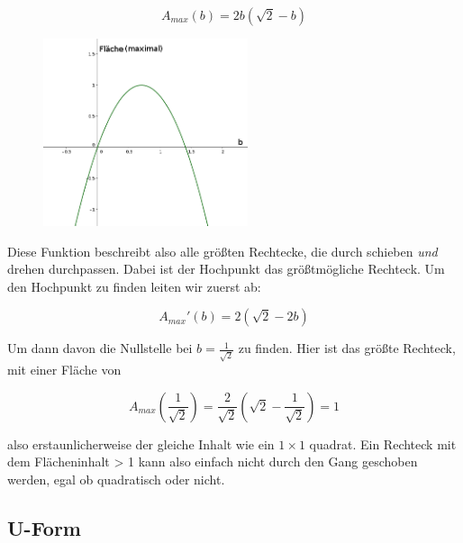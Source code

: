 \documentclass[a4paper,11pt]{article}
\begin{document}
\[ A_{max}(b) = 2b(\sqrt{2}-b) \]

\begin{figure}[H] 
        \centering
        \includegraphics[width=6cm]{img/FA_1.png}
\end{figure}

Diese Funktion beschreibt also alle größten Rechtecke, die durch schieben \textit{und} drehen durchpassen. Dabei ist der Hochpunkt das größtmögliche Rechteck. Um den Hochpunkt zu finden leiten wir zuerst ab:

\[ A_{max}'(b) = 2(\sqrt{2}-2b) \]

Um dann davon die Nullstelle bei $b = \frac{1}{\sqrt{2}}$ zu finden. Hier ist das größte Rechteck, mit einer Fläche von

\[ A_{max}(\frac{1}{\sqrt{2}}) = \frac{2}{\sqrt{2}}(\sqrt{2} - \frac{1}{\sqrt{2}}) = 1 \]

also erstaunlicherweise der gleiche Inhalt wie ein $1\times 1$ quadrat. Ein Rechteck mit dem Flächeninhalt > 1 kann also einfach nicht durch den Gang geschoben werden, egal ob quadratisch oder nicht.

\subsection{U-Form}
\end{document}
